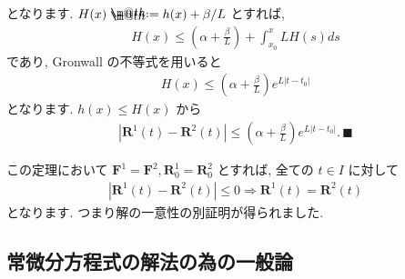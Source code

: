 \documentclass[openany, a4paper, oneside]{book}
\makeatletter
\newcommand*{\defeq}{\mathrel{\rlap{%
\raisebox{0.3ex}{$\m@th\cdot$}}%
\raisebox{-0.3ex}{$\m@th\cdot$}}%
=}
\theoremstyle{break}
\theoremstyle{breakdefn}
\newcommand{\abs}[1]{\left|#1\right|}
\newcommand{\bs}{\blacksquare}
\makeatother
\begin{document}
となります.
$H (x) \defeq h (x) + \beta / L$ とすれば,
\begin{gather}
H (x)
\leq
\left ( \alpha + \frac{\beta} {L} \right) + \int_{x_0}^x L H (s) ds
\end{gather}
であり, Gronwall の不等式を用いると
\begin{gather}
H (x)
\leq
\left ( \alpha + \frac{\beta} {L} \right) e^{ L| t - t_0 | }
\end{gather}
となります.
$h (x) \leq H (x)$ から
\begin{gather}
\abs{\bm{R}^1 (t) - \bm{R}^2 (t)}
\leq
\left ( \alpha + \frac{\beta} {L} \right) e^{ L| t - t_0 | } . \, \bs
\end{gather}

この定理において $\bm{F}^1 = \bm{F}^2 ,\bm{R}^1_0 =\bm{R}^2_0$ とすれば,
全ての $t \in I$ に対して
\begin{gather}
\abs{\bm{R}^1 (t) - \bm{R}^2 (t)} \leq 0
\Longrightarrow
\bm{R}^1 (t)
=
\bm{R}^2 (t)
\end{gather}
となります.
つまり解の一意性の別証明が得られました.
\subsection{常微分方程式の解法の為の一般論}
\label{sec-5-2-12-3}
\end{document}
